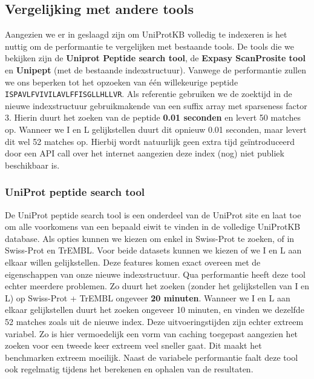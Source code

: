 \subsection{Vergelijking met andere tools}\label{subsec:vergelijking-met-andere-tools}
Aangezien we er in geslaagd zijn om UniProtKB volledig te indexeren is het nuttig om de performantie te vergelijken met bestaande tools.
De tools die we bekijken zijn de \textbf{Uniprot Peptide search tool}, de \textbf{Expasy ScanProsite tool} en \textbf{Unipept} (met de bestaande indexstructuur).
Vanwege de performantie zullen we ons beperken tot het opzoeken van één willekeurige peptide \texttt{ISPAVLFVIVILAVLFFISGLLHLLVR}.
Als referentie gebruiken we de zoektijd in de nieuwe indexstructuur gebruikmakende van een suffix array met sparseness factor 3.
Hierin duurt het zoeken van de peptide \textbf{0.01 seconden} en levert 50 matches op.
Wanneer we I en L gelijkstellen duurt dit opnieuw 0.01 seconden, maar levert dit wel 52 matches op.
Hierbij wordt natuurlijk geen extra tijd geïntroduceerd door een API call over het internet aangezien deze index (nog) niet publiek beschikbaar is.

\subsubsection{UniProt peptide search tool}
De UniProt peptide search tool\cite{uniprot_search_paper, uniprot_search_site} is een onderdeel van de UniProt site en laat toe om alle voorkomens van een bepaald eiwit te vinden in de volledige UniProtKB database.
Als opties kunnen we kiezen om enkel in Swiss-Prot te zoeken, of in Swiss-Prot en TrEMBL.
Voor beide datasets kunnen we kiezen of we I en L aan elkaar willen gelijkstellen.
Deze features komen exact overeen met de eigenschappen van onze nieuwe indexstructuur.
Qua performantie heeft deze tool echter meerdere problemen.
Zo duurt het zoeken (zonder het gelijkstellen van I en L) op Swiss-Prot + TrEMBL ongeveer \textbf{20 minuten}.
Wanneer we I en L aan elkaar gelijkstellen duurt het zoeken ongeveer 10 minuten, en vinden we dezelfde 52 matches zoals uit de nieuwe index.
Deze uitvoeringstijden zijn echter extreem variabel.
Zo is hier vermoedelijk een vorm van caching toegepast aangezien het zoeken voor een tweede keer extreem veel sneller gaat.
Dit maakt het benchmarken extreem moeilijk.
Naast de variabele performantie faalt deze tool ook regelmatig tijdens het berekenen en ophalen van de resultaten.


